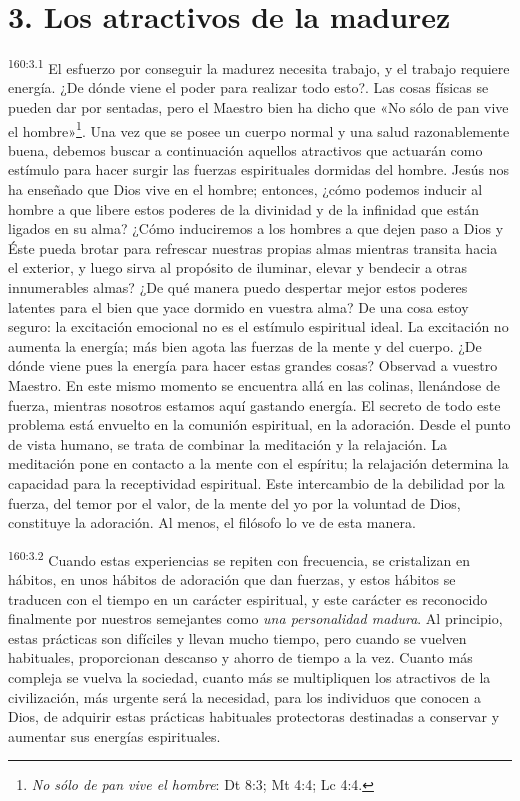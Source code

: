 \section*{3. Los atractivos de la madurez}
\par
\textsuperscript{160:3.1} El esfuerzo por conseguir la madurez necesita trabajo, y el trabajo requiere energía. ¿De dónde viene el poder para realizar todo esto?. Las cosas físicas se pueden dar por sentadas, pero el Maestro bien ha dicho que «No sólo de pan vive el hombre»\footnote{\textit{No sólo de pan vive el hombre}: Dt 8:3; Mt 4:4; Lc 4:4.}. Una vez que se posee un cuerpo normal y una salud razonablemente buena, debemos buscar a continuación aquellos atractivos que actuarán como estímulo para hacer surgir las fuerzas espirituales dormidas del hombre. Jesús nos ha enseñado que Dios vive en el hombre; entonces, ¿cómo podemos inducir al hombre a que libere estos poderes de la divinidad y de la infinidad que están ligados en su alma? ¿Cómo induciremos a los hombres a que dejen paso a Dios y Éste pueda brotar para refrescar nuestras propias almas mientras transita hacia el exterior, y luego sirva al propósito de iluminar, elevar y bendecir a otras innumerables almas? ¿De qué manera puedo despertar mejor estos poderes latentes para el bien que yace dormido en vuestra alma? De una cosa estoy seguro: la excitación emocional no es el estímulo espiritual ideal. La excitación no aumenta la energía; más bien agota las fuerzas de la mente y del cuerpo. ¿De dónde viene pues la energía para hacer estas grandes cosas? Observad a vuestro Maestro. En este mismo momento se encuentra allá en las colinas, llenándose de fuerza, mientras nosotros estamos aquí gastando energía. El secreto de todo este problema está envuelto en la comunión espiritual, en la adoración. Desde el punto de vista humano, se trata de combinar la meditación y la relajación. La meditación pone en contacto a la mente con el espíritu; la relajación determina la capacidad para la receptividad espiritual. Este intercambio de la debilidad por la fuerza, del temor por el valor, de la mente del yo por la voluntad de Dios, constituye la adoración. Al menos, el filósofo lo ve de esta manera.

\par
\textsuperscript{160:3.2} Cuando estas experiencias se repiten con frecuencia, se cristalizan en hábitos, en unos hábitos de adoración que dan fuerzas, y estos hábitos se traducen con el tiempo en un carácter espiritual, y este carácter es reconocido finalmente por nuestros semejantes como \textit{una personalidad madura}. Al principio, estas prácticas son difíciles y llevan mucho tiempo, pero cuando se vuelven habituales, proporcionan descanso y ahorro de tiempo a la vez. Cuanto más compleja se vuelva la sociedad, cuanto más se multipliquen los atractivos de la civilización, más urgente será la necesidad, para los individuos que conocen a Dios, de adquirir estas prácticas habituales protectoras destinadas a conservar y aumentar sus energías espirituales.

